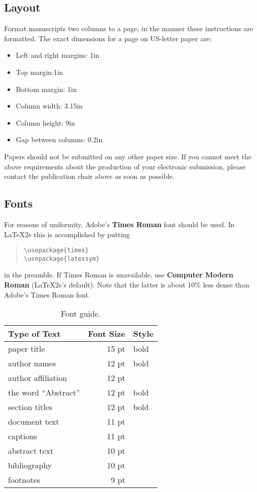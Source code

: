 \documentclass[11pt]{article}
\begin{document}
\subsection{Layout}
\label{ssec:layout}

Format manuscripts two columns to a page, in the manner these
instructions are formatted. The exact dimensions for a page on US-letter
paper are:

\begin{itemize}
\item Left and right margins: 1in
\item Top margin:1in
\item Bottom margin: 1in
\item Column width: 3.15in
\item Column height: 9in
\item Gap between columns: 0.2in
\end{itemize}

\noindent Papers should not be submitted on any other paper size. If you cannot meet the above requirements about the production of your electronic submission, please contact the publication chair above as soon as possible.

\subsection{Fonts}

For reasons of uniformity, Adobe's {\bf Times Roman} font should be
used. In \LaTeX2e{} this is accomplished by putting

\begin{quote}
\begin{verbatim}
\usepackage{times}
\usepackage{latexsym}
\end{verbatim}
\end{quote}
in the preamble. If Times Roman is unavailable, use {\bf Computer
  Modern Roman} (\LaTeX2e{}'s default).  Note that the latter is about
  10\% less dense than Adobe's Times Roman font.


\begin{table}[h]
\begin{center}
\begin{tabular}{|l|rl|}
\hline \bf Type of Text & \bf Font Size & \bf Style \\ \hline
paper title & 15 pt & bold \\
author names & 12 pt & bold \\
author affiliation & 12 pt & \\
the word ``Abstract'' & 12 pt & bold \\
section titles & 12 pt & bold \\
document text & 11 pt  &\\
captions & 11 pt & \\
abstract text & 10 pt & \\
bibliography & 10 pt & \\
footnotes & 9 pt & \\
\hline
\end{tabular}
\end{center}
\caption{\label{font-table} Font guide. }
\end{table}
\end{document}
